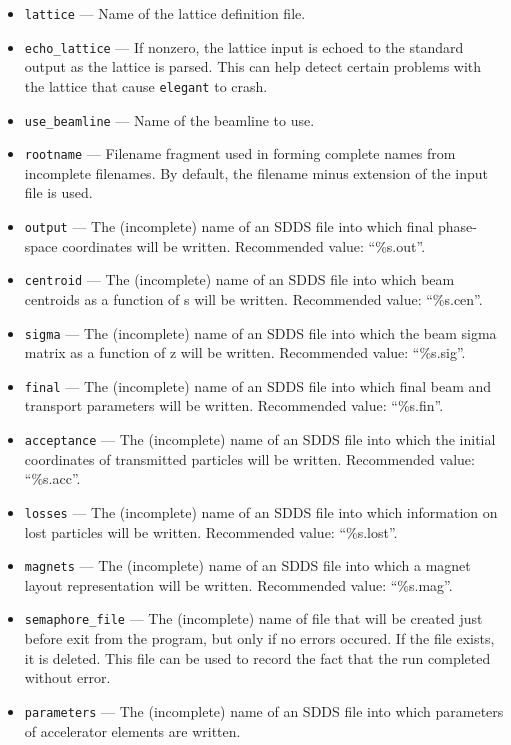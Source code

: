 \documentclass[11pt]{article}
\begin{document}
\begin{itemize}
\item \verb|lattice| --- Name of the lattice definition file.
\item \verb|echo_lattice| --- If nonzero, the lattice input is echoed to the
        standard output as the lattice is parsed.  This can help detect certain
        problems with the lattice that cause \verb|elegant| to crash.
\item \verb|use_beamline| --- Name of the beamline to use.
\item \verb|rootname| --- Filename fragment used in forming complete names from incomplete filenames.  By default, 
the filename minus extension of the input file is used.
\item \verb|output| --- The (incomplete) name of an SDDS file into which final phase-space coordinates
will be written.  Recommended value: ``\%s.out''.
\item \verb|centroid| --- The (incomplete) name of an SDDS file into which beam centroids as a function
of s will be written.   Recommended value: ``\%s.cen''.
\item \verb|sigma| --- The (incomplete) name of an SDDS file into
which the beam sigma matrix as a function of z will be written.
Recommended value: ``\%s.sig''.
\item \verb|final| --- The (incomplete) name of an SDDS file into
which final beam and transport parameters will be written. Recommended
value: ``\%s.fin''.
\item \verb|acceptance| --- The (incomplete) name of an SDDS file into
which the initial coordinates of transmitted particles will be
written.  Recommended value: ``\%s.acc''.
\item \verb|losses| --- The (incomplete) name of an SDDS file into
which information on lost particles will be written. Recommended
value: ``\%s.lost''.
\item \verb|magnets| --- The (incomplete) name of an SDDS file into
which a magnet layout representation will be written.  Recommended
value: ``\%s.mag''.
\item \verb|semaphore_file| --- The (incomplete) name of file that
will be created just before exit from the program, but only if no
errors occured.  If the file exists, it is deleted.  This file can be
used to record the fact that the run completed without error.
\item \verb|parameters| --- The (incomplete) name of an SDDS file into
which parameters of accelerator elements are written.

\end{itemize}
\end{document}
